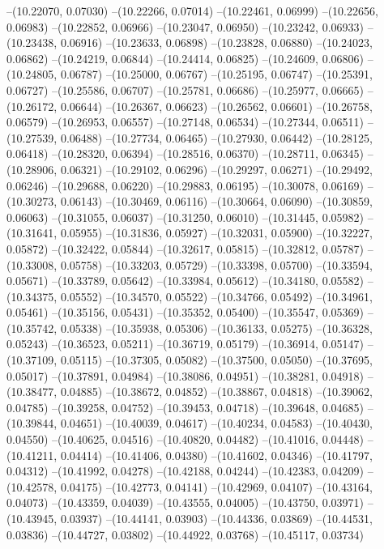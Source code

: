 --(10.22070, 0.07030)
--(10.22266, 0.07014)
--(10.22461, 0.06999)
--(10.22656, 0.06983)
--(10.22852, 0.06966)
--(10.23047, 0.06950)
--(10.23242, 0.06933)
--(10.23438, 0.06916)
--(10.23633, 0.06898)
--(10.23828, 0.06880)
--(10.24023, 0.06862)
--(10.24219, 0.06844)
--(10.24414, 0.06825)
--(10.24609, 0.06806)
--(10.24805, 0.06787)
--(10.25000, 0.06767)
--(10.25195, 0.06747)
--(10.25391, 0.06727)
--(10.25586, 0.06707)
--(10.25781, 0.06686)
--(10.25977, 0.06665)
--(10.26172, 0.06644)
--(10.26367, 0.06623)
--(10.26562, 0.06601)
--(10.26758, 0.06579)
--(10.26953, 0.06557)
--(10.27148, 0.06534)
--(10.27344, 0.06511)
--(10.27539, 0.06488)
--(10.27734, 0.06465)
--(10.27930, 0.06442)
--(10.28125, 0.06418)
--(10.28320, 0.06394)
--(10.28516, 0.06370)
--(10.28711, 0.06345)
--(10.28906, 0.06321)
--(10.29102, 0.06296)
--(10.29297, 0.06271)
--(10.29492, 0.06246)
--(10.29688, 0.06220)
--(10.29883, 0.06195)
--(10.30078, 0.06169)
--(10.30273, 0.06143)
--(10.30469, 0.06116)
--(10.30664, 0.06090)
--(10.30859, 0.06063)
--(10.31055, 0.06037)
--(10.31250, 0.06010)
--(10.31445, 0.05982)
--(10.31641, 0.05955)
--(10.31836, 0.05927)
--(10.32031, 0.05900)
--(10.32227, 0.05872)
--(10.32422, 0.05844)
--(10.32617, 0.05815)
--(10.32812, 0.05787)
--(10.33008, 0.05758)
--(10.33203, 0.05729)
--(10.33398, 0.05700)
--(10.33594, 0.05671)
--(10.33789, 0.05642)
--(10.33984, 0.05612)
--(10.34180, 0.05582)
--(10.34375, 0.05552)
--(10.34570, 0.05522)
--(10.34766, 0.05492)
--(10.34961, 0.05461)
--(10.35156, 0.05431)
--(10.35352, 0.05400)
--(10.35547, 0.05369)
--(10.35742, 0.05338)
--(10.35938, 0.05306)
--(10.36133, 0.05275)
--(10.36328, 0.05243)
--(10.36523, 0.05211)
--(10.36719, 0.05179)
--(10.36914, 0.05147)
--(10.37109, 0.05115)
--(10.37305, 0.05082)
--(10.37500, 0.05050)
--(10.37695, 0.05017)
--(10.37891, 0.04984)
--(10.38086, 0.04951)
--(10.38281, 0.04918)
--(10.38477, 0.04885)
--(10.38672, 0.04852)
--(10.38867, 0.04818)
--(10.39062, 0.04785)
--(10.39258, 0.04752)
--(10.39453, 0.04718)
--(10.39648, 0.04685)
--(10.39844, 0.04651)
--(10.40039, 0.04617)
--(10.40234, 0.04583)
--(10.40430, 0.04550)
--(10.40625, 0.04516)
--(10.40820, 0.04482)
--(10.41016, 0.04448)
--(10.41211, 0.04414)
--(10.41406, 0.04380)
--(10.41602, 0.04346)
--(10.41797, 0.04312)
--(10.41992, 0.04278)
--(10.42188, 0.04244)
--(10.42383, 0.04209)
--(10.42578, 0.04175)
--(10.42773, 0.04141)
--(10.42969, 0.04107)
--(10.43164, 0.04073)
--(10.43359, 0.04039)
--(10.43555, 0.04005)
--(10.43750, 0.03971)
--(10.43945, 0.03937)
--(10.44141, 0.03903)
--(10.44336, 0.03869)
--(10.44531, 0.03836)
--(10.44727, 0.03802)
--(10.44922, 0.03768)
--(10.45117, 0.03734)
